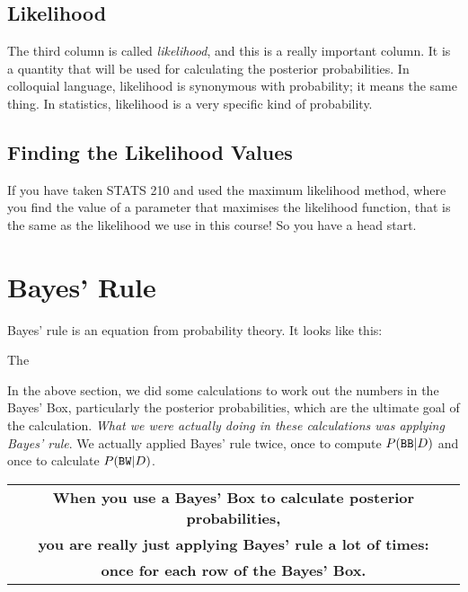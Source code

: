 \subsection{Likelihood}
The third column is called {\it likelihood}, and this is a really important
column. It is a quantity that will be used for calculating the posterior
probabilities. In colloquial language, likelihood is synonymous with
probability; it means the same thing. In statistics, likelihood is a very
specific kind of probability.





\subsection{Finding the Likelihood Values}


If you have taken STATS 210 and used the maximum likelihood method, where you
find the value of a parameter that maximises the likelihood function, that is
the same as the likelihood we use in this course! So you have a head start.


\section{Bayes' Rule}
Bayes' rule is an equation from probability theory. It looks like this:

\begin{figure}
\begin{center}

\end{center}
\end{figure}

The 

In the above section, we did some calculations to work out the numbers in the
Bayes' Box, particularly the posterior probabilities, which are the ultimate
goal of the calculation. {\it What we were actually doing in these calculations
was applying Bayes' rule}. We actually applied Bayes' rule twice, once to
compute $P(\texttt{BB} | D)$ and once to calculate $P(\texttt{BW} | D)$.


\begin{center}
\begin{tabular}{|c|}
\hline
{\bf When you use a Bayes' Box to calculate posterior probabilities,}\\
{\bf you are really just applying Bayes' rule a lot of times:}\\
{\bf once for each row of the Bayes' Box.}\\
\hline
\end{tabular}
\end{center}






